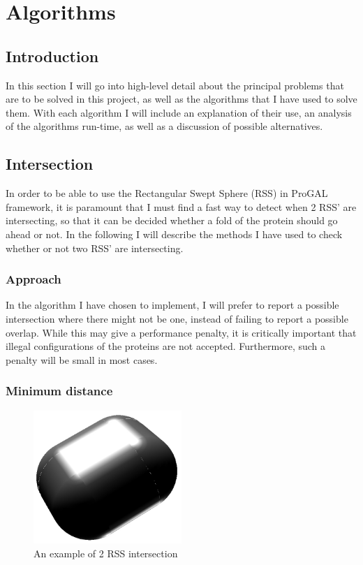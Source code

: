 
\section{Algorithms}
\label{algorithms}

\subsection{Introduction}
In this section I will go into high-level detail about the principal problems that are to be solved in this project, as well as the algorithms that I have used to solve them. With each algorithm I will include an explanation of their use, an analysis of the algorithms run-time, as well as a discussion of possible alternatives. 

\subsection{Intersection}
\label{intersection}
In order to be able to use the Rectangular Swept Sphere (RSS) in ProGAL framework, it is paramount that I must find a fast way to detect when 2 RSS' are intersecting, so that it can be decided whether a fold of the protein should go ahead or not. In the following I will describe the methods I have used to check whether or not two RSS' are intersecting.

\subsubsection{Approach}
In the algorithm I have chosen to implement, I will prefer to report a possible intersection where there might not be one, instead of failing to report a possible overlap. While this may give a performance penalty, it is critically important that illegal configurations of the proteins are not accepted. Furthermore, such a penalty will be small in most cases.

\subsubsection{Minimum distance}

\begin{figure}
\centering
\includegraphics[width=0.5\textwidth]{figures/normalInter}
\caption{\label{normal-inter}An example of 2 RSS intersection}
\end{figure}

